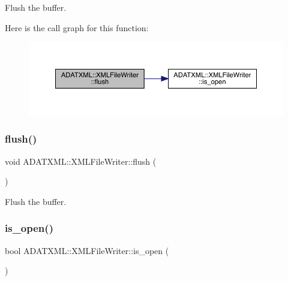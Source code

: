 Flush the buffer. 

Here is the call graph for this function\+:\nopagebreak
\begin{figure}[H]
\begin{center}
\leavevmode
\includegraphics[width=350pt]{d6/ddb/classADATXML_1_1XMLFileWriter_a63097bd3fafbcf99804b4106700b524d_cgraph}
\end{center}
\end{figure}
\mbox{\label{classADATXML_1_1XMLFileWriter_a63097bd3fafbcf99804b4106700b524d}} 
\subsubsection{\texorpdfstring{flush()}{flush()}\hspace{0.1cm}{\footnotesize\ttfamily [2/2]}}
{\footnotesize\ttfamily void A\+D\+A\+T\+X\+M\+L\+::\+X\+M\+L\+File\+Writer\+::flush (\begin{DoxyParamCaption}{ }\end{DoxyParamCaption})}



Flush the buffer. 

\mbox{\label{classADATXML_1_1XMLFileWriter_a60fa87bbd9300c37386f9fdcb9460f74}} 
\subsubsection{\texorpdfstring{is\_open()}{is\_open()}\hspace{0.1cm}{\footnotesize\ttfamily [1/2]}}
{\footnotesize\ttfamily bool A\+D\+A\+T\+X\+M\+L\+::\+X\+M\+L\+File\+Writer\+::is\+\_\+open (\begin{DoxyParamCaption}{ }\end{DoxyParamCaption})}

